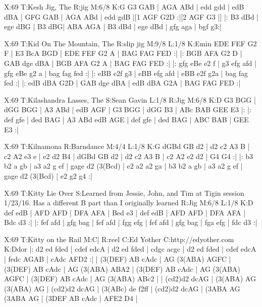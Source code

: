 \documentclass[letterpaper]{article}
\begin{document}
\begin{abc}[name]
X:69
T:Kesh Jig, The
R:jig
M:6/8
K:G
G3 GAB | AGA ABd | edd gdd | edB dBA |
GFG GAB | AGA ABd | edd gdB |[1 AGF G2D :|[2 AGF G3 |]
|: B3 dBd | ege dBG | B3 dBG| ABA AGA |
B3 dBd | ege dBd | gfg aga | bgf g3:|
\end{abc}

\begin{abc}[name]
X:69
T:Kid On The Mountain, The
R:slip jig
M:9/8
L:1/8
K:Emin
EDE FEF G2 F | E3 BcA BGD | EDE FEF G2 A | BAG FAG FED :|
|: BGB AFA G2 D | GAB dge dBA | BGB AFA G2 A | BAG FAG FED :|
|: gfg eBe e2 f | g3 efg afd | gfg eBe g2 a | bag fag fed :|
|: eBB e2f g3 | eBB efg afd | eBB e2f g2a | bag fag fed :|
|: edB dBA G2D | GAB dge dBA | edB dBA G2A | BAG FAG FED :|
\end{abc}

\begin{abc}[name]
X:69
T:Kilashandra Lasses, The
S:Sean Gavin
L:1/8
R:Jig
M:6/8
K:D
G3 BGG | dGG BGG | A3 ABd | edB AGF |
G3 BGG | dGG B3 | ABc BAB GEE E3 |:
|: def gfe | ded BAG | A3 ABd edB AGE |
def gfe | ded BAG | ABC BAB | GEE E3 :|
\end{abc}

\begin{abc}[name]
X:69
T:Kilnamona
R:Barndance
M:4/4
L:1/8
K:G
dGBd GB d2 | d2 c2 A3 B | c2 A2 e3 e | e2 d2 B4 |
dGBd GB d2 | d2 c2 A3 B | c2 A2 e2 d2 | G4 G4 :|
|: b3 b2 a gb | a3 a2 g ef | gage d2 (3(Bcd) | e2 a2 a2 ga |
b3 b2 a gb | a3 a2 g ef | gage d2 (3(Bcd) | e2 g2 g4 :|
\end{abc}

\begin{abc}[name]
X:69
T:Kitty Lie Over
S:Learned from Jessie, John, and Tim at Tigin session 1/23/16. Has a different B part than I originally learned
R:Jig
M:6/8
L:1/8
K:D
def edB | AFD AFD | DFA AFA | Bed e3 |
def edB | AFD AFD | DFA AFA | Bdc d3 :|
|: fef afd | gfg bag | fef afd | fgg efg |
fef afd | gfg bag | fga efg | fdc d3 :|
\end{abc}

\begin{abc}[name]
X:69
T:Kitty on the Rail
M:C|
R:reel
C:Ed Yother
C:http://edyother.com
K:Ddor
|: d2 ed fded | cdef edcA | d2 ed fded | cdgc acgc |
d2 ed fded | cdef edcA | fedc AGAB | cAdc AFD2 :|
| (3(DEF) AB cAdc | AG (3(ABA) AGFC | (3(DEF) AB cAdc | AG (3(ABA) ABA2 |
(3(DEF) AB cAdc | AG (3(ABA) AGFC | (3(DEF) AB cAdc | AG (3(ABA) ABc2 |
| ({c}d2)d2 dcAG | (3(ABA) AG (3(ABA) AG | ({c}d2)d2 dcAG | (3(ABc) de f2ff |
({c}d2)d2 dcAG | (3ABA AG (3ABA AG | (3DEF AB cAdc | AFE2 D4 |
\end{abc}
\end{document}
